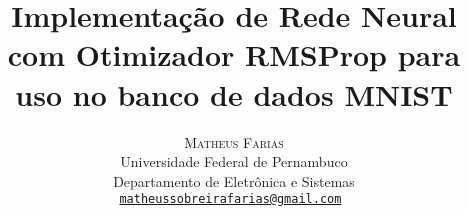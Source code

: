\title{\LARGE \bf Implementação de Rede Neural com Otimizador RMSProp para uso no banco de dados MNIST}
%
%
%
%
%
%
%
%
%
%
%
\author{%
\textsc{Matheus Farias}%
\\[1ex] %
\normalsize Universidade Federal de Pernambuco \\ %
\normalsize Departamento de Eletrônica e Sistemas \\
\normalsize \tt{\href{mailto:matheussobreirafarias@gmail.com}{matheussobreirafarias@gmail.com}}%
%
}
